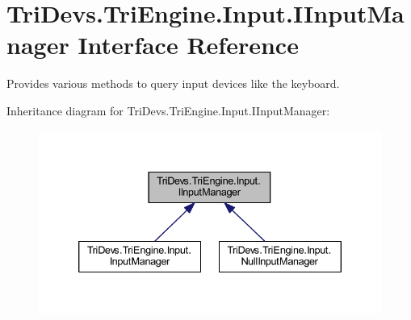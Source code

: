 \hypertarget{interface_tri_devs_1_1_tri_engine_1_1_input_1_1_i_input_manager}{\section{Tri\-Devs.\-Tri\-Engine.\-Input.\-I\-Input\-Manager Interface Reference}
\label{interface_tri_devs_1_1_tri_engine_1_1_input_1_1_i_input_manager}
}


Provides various methods to query input devices like the keyboard.  




Inheritance diagram for Tri\-Devs.\-Tri\-Engine.\-Input.\-I\-Input\-Manager\-:
\nopagebreak
\begin{figure}[H]
\begin{center}
\leavevmode
\includegraphics[width=335pt]{interface_tri_devs_1_1_tri_engine_1_1_input_1_1_i_input_manager__inherit__graph}
\end{center}
\end{figure}
